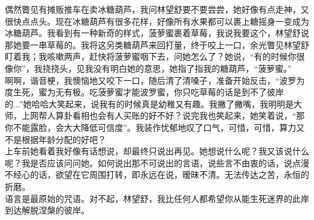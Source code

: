\documentclass[letterpaper, 12pt]{article}
\begin{document}
\begin{multicols}{2}
偶然瞥见有摊贩推车在卖冰糖葫芦，我问林望舒要不要尝尝，她好像有点走神，又很快点点头。现在冰糖葫芦有很多花样，好像所有水果都可以裹上糖摇身一变成为冰糖葫芦。我看到有一种新奇的样式，菠萝蜜裹着草莓，我说我要这个，林望舒说那她要一串草莓的。我将这另类糖葫芦来回打量，终于咬上一口，余光瞥见林望舒盯着我；我咳嗽两声，赶快将菠萝蜜咽下去，问她怎么了？她说，“有的时候你很像你”，我挠挠头，见我没有明白她的意思，她指了指我的糖葫芦，“菠萝蜜。”\\

啊啊，谐音梗，我懊恼地又咬下一口，随后清了清嗓子，准备开始反击，“波罗为度生死，蜜为无有极。吃菠萝蜜才能波罗蜜，你只吃草莓的话是到不了彼岸的...”她哈哈大笑起来，说我有的时候真是幼稚又有趣。我撇了撇嘴，我明明是大师，上网帮人算卦看相也会有人买账的好不好？说完我也笑起来，她笑着说，“那你不能露脸，会大大降低可信度”。我装作忧郁地叹了口气，可惜，可惜，算力又不是根据年龄分配的好吧？\\

上车前她看着我好像有话想说，却最终只说出再见。她想说什么呢？我又该说什么呢？我是否应该问问她。如何说出那不可说出的言语，说些言不由衷的话，说点漫不经心的话，欲望在它周围打转，即永远在说，暧昧不清。无法传达之苦，永恒的折磨。\\

语言是最原始的咒语。对不起，林望舒，我比任何人都希望你从能生死迷界的此岸到达解脱涅槃的彼岸。\\

\end{multicols} 
\end{document}
